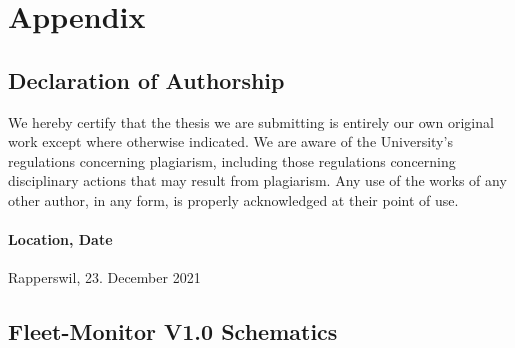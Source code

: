 \chapter{Appendix}
\pagebreak
\section{Declaration of Authorship} \label{Declaration of Authorship}
We hereby certify that the thesis we are submitting is entirely our own original work except where otherwise indicated. We are aware of the University’s regulations concerning plagiarism, including those regulations concerning disciplinary actions that may result from plagiarism. Any use of the works of any other author, in any form, is properly acknowledged at their point of use.

\subsubsection{Location, Date}
Rapperswil, 23. December 2021


\clearpage


\section{Fleet-Monitor V1.0 Schematics} \label{Fleet-Monitor V1.0 Schematics}
\enlargethispage{2.5cm}
\begin{adjustwidth}{-0.23cm}{0cm} \hfuzz=7.0pt
\end{adjustwidth}
\newpage

